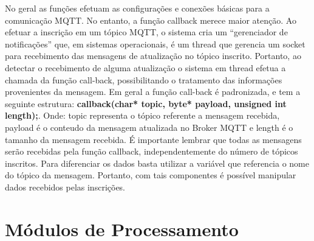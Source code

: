     No geral as funções efetuam as configurações e conexões básicas para a comunicação MQTT. No entanto, a função callback merece maior atenção.
	Ao efetuar a inscrição em um tópico MQTT, o sistema cria um “gerenciador de notificações” que, em sistemas operacionais, é um thread que gerencia um socket para recebimento das mensagens de atualização no tópico inscrito. Portanto, ao detectar o recebimento de alguma atualização o sistema em thread efetua a chamada da função call-back, possibilitando o tratamento das informações provenientes da mensagem.
	Em geral a função call-back é padronizada, e tem a seguinte estrutura:
    \textbf{callback(char* topic, byte* payload, unsigned int length);}.
    Onde: topic representa o tópico referente a mensagem recebida, payload é o conteudo da mensagem atualizada no Broker MQTT e length é o tamanho da mensagem recebida.
	É importante lembrar que todas as mensagens serão recebidas pela função callback, independentemente do número de tópicos inscritos. Para diferenciar os dados basta utilizar a variável que referencia o nome do tópico da mensagem. Portanto, com tais componentes é possível manipular dados recebidos pelas inscrições.

\section{Módulos de Processamento}
